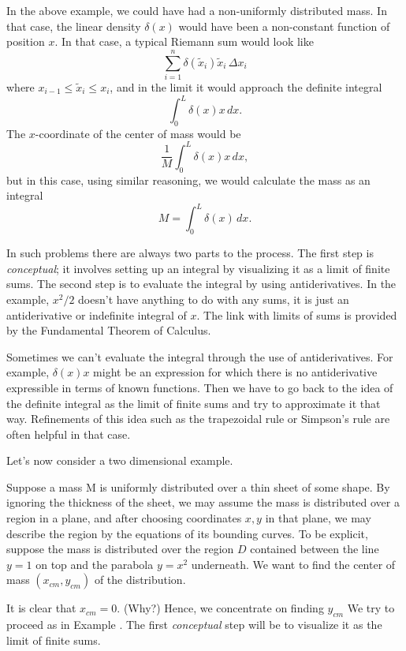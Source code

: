 In the above example, we could have had a non-uniformly
distributed mass.  In that case, the linear
density $\delta(x)$
%
would have been a non-constant function of position  $x$.
In that case, a typical Riemann sum would look like
$$
   \sum_{i=1}^n \delta(\tilde x_i)\tilde x_i\, \Delta x_i
$$
where $x_{i-1} \le \tilde x_i \le x_i$, and in the limit
it would approach the definite integral
$$
   \int_0^L \delta(x)x\, dx.
$$
The $x$-coordinate of the center of mass would be
$$
   \frac 1M \int_0^L \delta(x) x\, dx,
$$
but in this case, using similar reasoning, we would calculate
the mass as an integral
$$
    M = \int_0^L \delta(x)\, dx.
$$

In such problems there are always two parts to the process.
The first step is {\it conceptual\/}; it involves setting up
an integral by visualizing it as a limit of  finite sums. 
The second step is to evaluate the integral by using
antiderivatives. 
In the example, $x^2/2$ doesn't have anything to do with any
sums, it is just an antiderivative or indefinite integral of
$x$.  The link with limits of sums is provided by the Fundamental
Theorem of Calculus.

Sometimes we can't evaluate the integral through the use of
antiderivatives.  For example, $\delta(x)x$ might be
an expression for which there is no antiderivative expressible
in terms of known functions.  Then we have to go back to 
the idea of the definite integral as
the limit of finite sums and try to approximate it that way.
Refinements of this idea such as the trapezoidal rule or
Simpson's rule are often helpful in that case. 

Let's now consider a two dimensional example.  

\nextex
\xdef\ExTwo{\en}
   Suppose a mass M is uniformly distributed
over a thin sheet of some shape.  
By ignoring the  thickness of the sheet, we may assume the mass
is distributed over a region in a plane, and after choosing
coordinates $x,y$ in that plane, we may describe the region by
the equations of its bounding curves.   To be explicit, suppose
the mass is distributed over the region $D$ contained between
the line $y = 1$ on top and the parabola $y = x^2$ underneath.
We want to find the center of mass $(x_{cm}, y_{cm})$ of the distribution.
\medskip
\centerline{}
\medskip
\noindent
It is clear that $x_{cm} = 0$.  (Why?)   Hence, we concentrate
on finding $y_{cm}$
We try to proceed as in Example \ExOne.   The first {\it conceptual\/}
 step will be to visualize it as the limit of finite sums.

